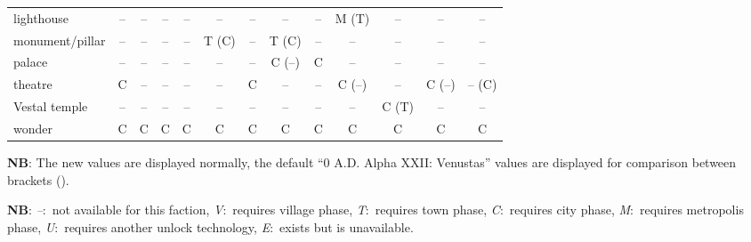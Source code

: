 \documentclass{article}
\newcommand{\legenda}{
\textbf{NB}:
\emph{--}:~not available for this faction, 
\emph{V}:~requires village phase, 
\emph{T}:~requires town phase, 
\emph{C}:~requires city phase, 
\emph{M}:~requires metropolis phase, 
\emph{U}:~requires another unlock technology, 
\emph{E}:~exists but is unavailable.
}
\begin{document}
\begin{tabular}{l|cccc|cccc|cccc}
lighthouse        & -- & -- & -- & -- & -- & -- & -- & -- & M (T) & -- & -- & -- \\
monument/pillar   & -- & -- & -- & -- & T (C) & -- & T (C) & -- & -- & -- & -- & -- \\
palace            & -- & -- & -- & -- & -- & -- & C (--) & C  & -- & -- & -- & -- \\
theatre           & C  & -- & -- & -- & -- & C  & -- & -- & C (--) & -- & C (--) & -- (C) \\
Vestal temple     & -- & -- & -- & -- & -- & -- & -- & -- & -- & C (T) & -- & -- \\
\hline
wonder            & C  & C & C & C & C & C & C & C & C & C & C & C \\
\end{tabular}

\textbf{NB}: The new values are displayed normally, the default ``0 A.D. Alpha XXII: Venustas'' values are displayed for comparison between brackets (). 
\legenda
\end{document}
